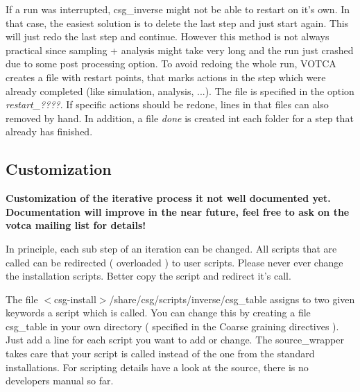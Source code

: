 If a run was interrupted, csg\_inverse might not be able to restart on it's own. In that case, the easiest solution is to delete the last step and just start again. This will just redo the last step and continue. However this method is not always practical since sampling + analysis might take very long and the run just crashed due to some post processing option. To avoid redoing the whole run, VOTCA creates a file with restart points, that marks actions in the step which were already completed (like simulation, analysis, ...). The file is specified in the option \textit{restart\_????}. If specific actions should be redone, lines in that files can also removed by hand. In addition, a file \textit{done} is created int each folder for a step that already has finished.

\subsection{Customization}
\textbf{Customization of the iterative process it not well documented yet. Documentation will improve in the near future, feel free to ask on the votca mailing list for details! }

In principle, each sub step of an iteration can be changed. All scripts that are called can be redirected ( overloaded ) to user scripts. Please never ever change the \votca installation scripts. Better copy the script and redirect it's call.

The file $<$csg-install$>$/share/csg/scripts/inverse/csg\_table assigns to two given keywords a script which is called. You can change this by creating a file
csg\_table in your own directory ( specified in the Coarse graining directives ). Just add a line for each script you want to add or change. The source\_wrapper takes care that your script is called instead of the one from the standard installations. For scripting details have a look at the source, there is no developers manual so far.
